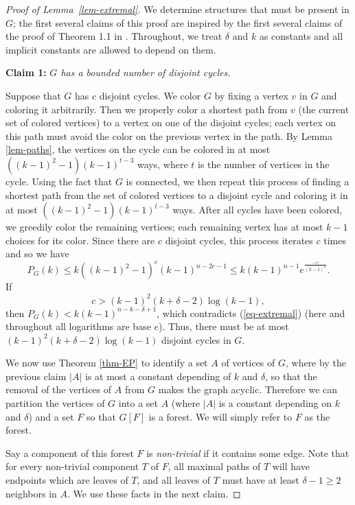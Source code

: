 \documentclass[11pt]{article}
\theoremstyle{plain}
\theoremstyle{definition}
\theoremstyle{remark}
\begin{document}
\begin{proof}[Proof of Lemma~\ref{lem-extremal}]
We determine structures that must be present in $G$; the first several claims of this proof are inspired by the first several claims of the proof of Theorem 1.1 in \cite{GuggiariScott}. Throughout, we treat $\delta$ and $k$ as constants and all implicit constants are allowed to depend on them.

\bigskip

\noindent\textbf{Claim 1:} {\em $G$ has a bounded number of disjoint cycles.}

Suppose that $G$ has $c$ disjoint cycles.  We color $G$ by fixing a vertex $v$ in $G$ and coloring it arbitrarily.  Then we properly color a shortest path from $v$ (the current set of colored vertices) to a vertex on one of the disjoint cycles; each vertex on this path must avoid the color on the previous vertex in the path.  By Lemma \ref{lem-paths}, the vertices on the cycle can be colored in at most $((k-1)^2-1)(k-1)^{t-3}$ ways, where $t$ is the number of vertices in the cycle. Using the fact that $G$ is connected, we then repeat this process of finding a shortest path from the set of colored vertices to a disjoint cycle and coloring it in at most $((k-1)^2-1)(k-1)^{t-3}$ ways.  After all cycles have been colored, we greedily color the remaining vertices; each remaining vertex has at most $k-1$ choices for its color.  Since there are $c$ disjoint cycles, this process iterates $c$ times and so we have
\[
P_{G}(k) \leq k((k-1)^2-1)^c (k-1)^{n-2c-1} \leq k(k-1)^{n-1}e^{\frac{-c}{(k-1)^2}}.
\]
If
\[
c > (k-1)^2(k+\delta-2)\log(k-1), 
\]
then $P_{G}(k) < k(k-1)^{n-k-\delta+1}$, which contradicts (\ref{eq-extremal}) (here and throughout all logarithms are base $e$). Thus, there must be at most $(k-1)^2(k+\delta-2)\log(k-1)$ disjoint cycles in $G$.

\bigskip

We now use Theorem \ref{thm-EP} to identify a set $A$ of vertices of $G$, where by the previous claim $|A|$ is at most a constant depending of $k$ and $\delta$, so that the removal of the vertices of $A$ from $G$ makes the graph acyclic.  Therefore we can partition the vertices of $G$ into a set $A$ (where $|A|$ is a constant depending on $k$ and $\delta$) and a set $F$ so that $G[F]$ is a forest.  We will simply refer to $F$ as the forest.

Say a component of this forest $F$ is {\em non-trivial} if it contains some edge. Note that for every non-trivial component $T$ of $F$, all maximal paths of $T$ will have endpoints which are leaves of $T$, and all leaves of $T$ must have at least $\delta - 1 \ge 2$ neighbors in $A$. We use these facts in the next claim.


\end{proof}
\end{document}
